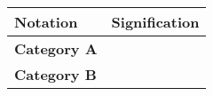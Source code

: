 \begin{tabularx}{\linewidth}{lX}
	\toprule
	\textbf{Notation}  & \textbf{Signification} \\
	\midrule
	\textbf{Category A} &                        \\
	\midrule
    
    \midrule
	\textbf{Category B} &                        \\
	\midrule
\end{tabularx}